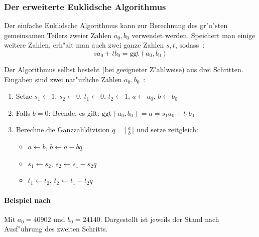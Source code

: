 \documentclass[12pt]{article}
\newcommand{\floor}[1]{\lfloor #1 \rfloor}
\begin{document}
\subsubsection{Der erweiterte Euklidsche Algorithmus}
\label{subsubsec:math:euclid}
Der einfache Euklidsche Algorithmus kann zur Berechnung des gr"o"sten gemeinsamen
Teilers zweier Zahlen $a_0, b_0$ verwendet werden.
Speichert man einige weitere Zahlen, erh"alt man auch zwei ganze Zahlen $s, t$, sodass~\cite{taocp2}:
\begin{equation}\label{eq:euclid} sa_0 + tb_0 = \textrm{ggt}(a_0, b_0) \end{equation}

Der Algorithmus selbst besteht (bei geeigneter Z"ahlweise) aus drei Schritten.
Eingaben sind zwei nat"urliche Zahlen $a_0, b_0$~\cite{taocp2}:
\begin{enumerate}
    \item Setze $s_1 \gets 1$, $s_2 \gets 0$, $t_1 \gets 0$, $t_2 \gets 1$, $a \gets a_0$, $b \gets b_0$
    \item Falls $b = 0$: Beende, es gilt: $\textrm{ggt}(a_0, b_0) = a = s_1 a_0 + t_1 b_0$
    \item Berechne die Ganzzahldivision $q = \floor{\frac{a}{b}}$ und setze zeitgleich:
    \begin{itemize}
        \item $a \gets b$, $b \gets a - bq$
        \item $s_1 \gets s_2$, $s_2 \gets s_1 - s_2 q$
        \item $t_1 \gets t_2$, $t_2 \gets t_1 - t_2 q$
    \end{itemize}
\end{enumerate}

\paragraph{Beispiel nach~\cite{taocp2}}
Mit $a_0 = 40902$ und $b_0 = 24140$.
Dargestellt ist jeweils der Stand nach Ausf"uhrung des zweiten Schritts.\\
\end{document}
